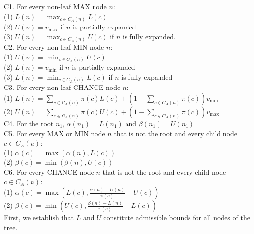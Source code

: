 \documentclass[runningheads]{llncs}
\newcommand{\pess}{\mathit{L}}
\newcommand{\opti}{\mathit{U}}
\newcommand{\vmax}{v_{\text{max}}}
\newcommand{\vmin}{v_{\text{min}}}
\newcommand{\rootnode}{\mathit{n_1}}
\begin{document}
\noindent C1. For every non-leaf MAX node $n$:\\ 
 \indent (1) $\pess(n)=\max_{c\in C_A(n)} \pess(c)$\\
 \indent (2) $\opti(n)=\vmax$ if $n$ is partially expanded \\
 \indent (3) $\opti(n)=\max_{c\in C_A(n)} \opti(c)$ if $n$ is fully expanded.\\[2mm]
\noindent C2. For every non-leaf MIN node $n$:\\
\indent (1) $\opti(n)=\min_{c\in C_A(n)} \opti(c)$ \\
\indent (2) $\pess(n)=\vmin$ if $n$ is partially expanded \\
\indent (3) $\pess(n)=\min_{c\in C_A(n)} \pess(c)$ if $n$ is fully expanded\\[2mm]
\noindent C3. For every non-leaf CHANCE node $n$:\\ 
\indent (1) $\pess(n)= \sum\limits_{c\in C_A(n)} \pi(c) \pess(c) + (1-\sum\limits_{c\in C_A(n)} \pi(c)) \vmin{}$ \\
\indent (2) $\opti(n)= \sum\limits_{c\in C_A(n)} \pi(c) \opti(c) + (1-\sum\limits_{c\in C_A(n)} \pi(c)) \vmax{}$ \\[2mm]
\noindent C4. For the root $n_1$, $\alpha(\rootnode)=\pess(\rootnode)$ and $\beta(\rootnode)=\opti(\rootnode)$\\[2mm]
\noindent C5. For every MAX or MIN node $n$ that is not the root and every child node $c\in C_A(n)$:\\
\indent (1) $\alpha(c)=\max(\alpha(n),\pess(c))$\\
\indent (2) $\beta(c)=\min(\beta(n),\opti(c))$ \\[2mm]
\noindent C6. For every CHANCE node $n$  that is not the root and every child node $c \in C_A(n)$:\\
\indent (1) $\alpha(c) = \max(\pess(c), \frac{\alpha(n)-\opti(n)}{\pi(c)}+\opti(c))$ \\
\indent (2) $\beta(c) = \min(\opti(c), \frac{\beta(n)-\pess(n)}{\pi(c)}+\pess(c))$\\


First, we establish that $\pess$ and $\opti$ constitute admissible bounds for all nodes of the tree.
\end{document}
